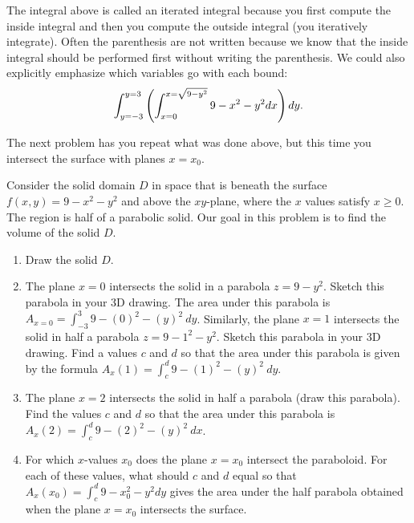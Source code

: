 The integral above is called an iterated integral because you first compute the inside integral and then you compute the outside integral (you iteratively integrate). Often the parenthesis are not written because we know that the inside integral should be performed first without writing the parenthesis. We could also explicitly emphasize which variables go with each bound:
$$\displaystyle\int_{y=-3}^{y=3} \left(\int_{x=0}^{x=\sqrt{9-y^2}}9-x^2-y^2 dx\right) dy.$$   

The next problem has you repeat what was done above, but this time you intersect the surface with planes $x=x_0$. 

\begin{problem}%
Consider the solid domain $D$ in space that is beneath the surface $f(x,y)=9-x^2-y^2$ and above the $xy$-plane, where the $x$ values satisfy $x\geq 0$.  The region is half of a parabolic solid.  Our goal in this problem is to find the volume of the solid $D$.
\begin{enumerate}
 \item Draw the solid $D$. 
 \item The plane $x=0$ intersects the solid in a parabola $z=9-y^2$. Sketch this parabola in your 3D drawing. The area under this parabola is $A_{x=0} = \int_{-3}^3 9-(0)^2-(y)^2 \ dy$. 
 Similarly, the plane $x=1$ intersects the solid in half a parabola $z=9-1^2-y^2$. Sketch this parabola in your 3D drawing. Find a values $c$ and $d$ so that the area under this parabola is given by the formula $A_x(1)=\int_c^{d} 9-(1)^2-(y)^2 \ dy$.
 \item The plane $x=2$ intersects the solid in half a parabola (draw this parabola). Find the values $c$ and $d$ so that the area under this parabola is $A_x(2)=\int_c^d 9-(2)^2-(y)^2 \ dx$.
 \item {}
For which $x$-values $x_0$ does the plane $x=x_0$ intersect the paraboloid. For each of these values, what should $c$ and $d$ equal so that $A_x(x_0) = \int_c^d 9-x_0^2-y^2 dy$ gives the area under the half parabola obtained when the plane $x=x_0$ intersects the surface. 

\end{enumerate}
\end{problem}
